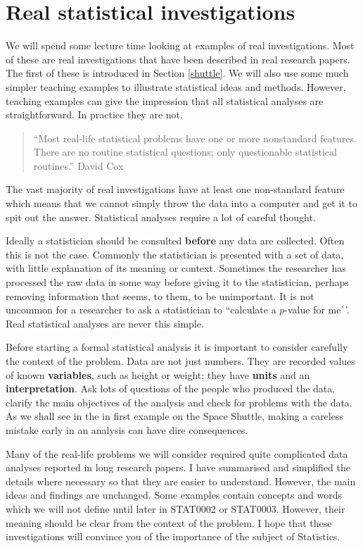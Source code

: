 \documentclass[
  british,
  11pt,
  openany, a4paper]{book}
\begin{document}
\section{Real statistical investigations}\label{real}

We will spend some lecture time looking at examples of real investigations. Most of these are real investigations that have been described in real research papers. The first of these is introduced in Section \ref{shuttle}. We will also use some much simpler teaching examples to illustrate statistical ideas and methods. However, teaching examples can give the impression that all statistical analyses are straightforward. In practice they are not.

\begin{quote}
``Most real-life statistical problems have one or more nonstandard features. There are no routine statistical questions; only questionable statistical routines.'' David Cox
\end{quote}

The vast majority of real investigations have at least one non-standard feature which means that we cannot simply throw the data into a computer and get it to spit out the answer. Statistical analyses require a lot of careful thought.

Ideally a statistician should be consulted \textbf{before} any data are collected. Often this is not the case. Commonly the statistician is presented with a set of data, with little explanation of its meaning or context. Sometimes the researcher has processed the raw data in some way before giving it to the statistician, perhaps removing information that seems, to them, to be unimportant. It is not uncommon for a researcher to ask a statistician to ``calculate a \(p\)-value for me'\,'. Real statistical analyses are never this simple.

Before starting a formal statistical analysis it is important to consider carefully the context of the problem. Data are not just numbers. They are recorded values of known \textbf{variables}, such as height or weight;
they have \textbf{units} and an \textbf{interpretation}. Ask lots of questions of the people who produced the data, clarify the main objectives of the analysis and check for problems with the data. As we shall see in the in first example on the Space Shuttle, making a careless mistake early in an analysis can have
dire consequences.

Many of the real-life problems we will consider required quite complicated data analyses reported in long research papers. I have summarised and simplified the details where necessary so that they are easier to understand. However, the main ideas and findings are unchanged. Some examples contain concepts and words which we will not define until later in STAT0002 or STAT0003. However, their meaning should be clear from the context of the problem. I hope that these investigations will convince you of the importance of the subject of Statistics.
\end{document}
